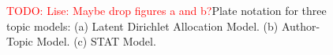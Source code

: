 \documentclass[conference]{IEEEtran}
\newcommand{\model}{{STAT}\xspace} %
\newcommand{\todo}[1]{\textcolor{red}{{TODO: #1}}}
\begin{document}
\begin{figure}[ht]
\begin{center}
\end{center}
\caption{\todo{Lise: Maybe drop figures a and b?}Plate notation for three topic models: (a) Latent Dirichlet Allocation Model. (b) Author-Topic Model. (c) \model Model.}
\label{fig:models}
\end{figure}
\end{document}
